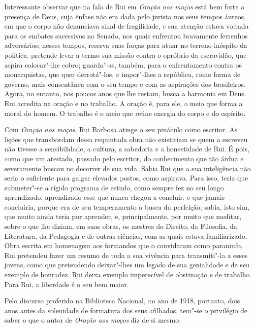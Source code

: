 Interessante observar que na fala de Rui em \textit{Oração aos moços} está
bem forte a presença de Deus, cuja ênfase não era dada pelo jurista nos
seus tempos áureos, em que o corpo não denunciava sinal de fragilidade,
e sua atenção estava voltada para os embates sucessivos no Senado, nos
quais enfrentou bravamente ferrenhos adversários; nesses tempos, reserva
suas forças para atuar no terreno inóspito da política; pretende levar
a termo sua missão contra o opróbrio da escravidão, que aspira
colocar"-lhe cobro; guarda"-as, também, para o enfrentamento contra os
monarquistas, que quer derrotá"-los, e impor"-lhes a república, como
forma de governo, mais consentânea com o seu tempo e com as aspirações
dos brasileiros. Agora, no entanto, nos poucos anos que lhe restam,
busca a harmonia em Deus. Rui acredita na oração e no trabalho. A
oração é, para ele, o meio que forma a moral do homem. O trabalho é o
meio que reúne energia do corpo e do espírito.

Com \textit{Oração aos moços}, Rui Barbosa atinge o seu pináculo como escritor.
As lições que transbordam dessa requintada obra não existiriam se quem
a escreveu não tivesse a sensibilidade, a cultura, a sabedoria e a
honestidade de Rui. É pois, como que um atestado,
passado pelo escritor, do conhecimento que tão árdua e severamente
buscou no decorrer de sua vida. Sabia Rui que a sua inteligência não
seria o suficiente para galgar elevados postos, como aspirava. Para
isso, teria que submeter"-se a rígido programa de estudo, como sempre
fez no seu longo aprendizado, aprendizado esse que nunca chegou a
concluir, e que jamais concluiria, porque era de seu temperamento a
busca da perfeição; sabia, isto sim, que muito ainda teria por
aprender, e, principalmente, por muito que meditar, sobre o que lhe
diziam, em suas obras, os mestres do Direito, da Filosofia, da
Literatura, da Pedagogia e de outras ciências, com as quais estava
familiarizado. Obra escrita em homenagem aos
formandos que o convidaram como paraninfo, Rui pretendeu fazer um
resumo de toda a sua vivência para transmiti"-la a esses jovens, como
que pretendendo deixar"-lhes um legado de sua genialidade e de seu
exemplo de honradez. Rui deixa exemplo imperecível de obstinação e de
trabalho. Para Rui, a liberdade é o seu bem maior. 

Pelo discurso proferido na Biblioteca Nacional, no ano de 1918,
portanto, dois anos antes da solenidade de formatura dos seus
afilhados, tem"-se o privilégio de saber o que o autor de \textit{Oração aos
moços} diz de si mesmo: 

